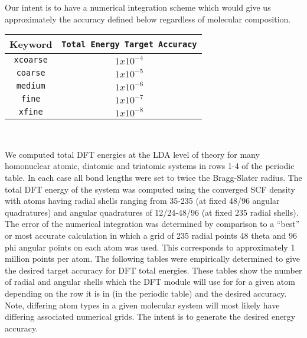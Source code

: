 Our intent is to have a numerical integration scheme which would give
us approximately the accuracy defined below regardless of molecular
composition.  
\begin{center}
  \begin{tabular}[right]{|c|c|} \hline
Keyword & {\tt Total Energy Target Accuracy} \\ \hline
{\tt xcoarse} & $1x10^{-4}$ \\ \hline
{\tt coarse}  & $1x10^{-5}$ \\ \hline
{\tt medium}  & $1x10^{-6}$ \\ \hline
{\tt fine}    & $1x10^{-7}$ \\ \hline
{\tt xfine}   & $1x10^{-8}$ \\ \hline
  \end{tabular} \\
\end{center}

We computed total DFT energies at the LDA level of theory for many
homonuclear atomic, diatomic and triatomic systems in rows 1-4 of the
periodic table.  In each case all bond lengths were set to twice the
Bragg-Slater radius.  The total DFT energy of the system was computed
using the converged SCF density with atoms having radial shells
ranging from 35-235 (at fixed 48/96 angular quadratures) and angular
quadratures of 12/24-48/96 (at fixed 235 radial shells).  The error of
the numerical integration was determined by comparison to a ``best''
or most accurate calculation in which a grid of 235 radial points 48
theta and 96 phi angular points on each atom was used.  This
corresponds to approximately 1 million points per atom.  The following
tables were empirically determined to give the desired target accuracy
for DFT total energies.  These tables show the number of radial and
angular shells which the DFT module will use for for a given atom
depending on the row it is in (in the periodic table) and the desired
accuracy.  Note, differing atom types in a given molecular system will
most likely have differing associated numerical grids.  The intent is
to generate the desired energy accuracy.

